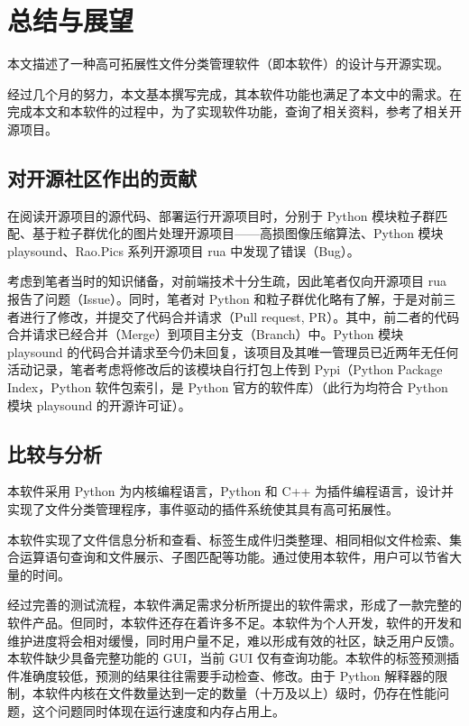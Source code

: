 \chapter{总结与展望}

本文描述了一种高可拓展性文件分类管理软件（即本软件）的设计与开源实现。

经过几个月的努力，本文基本撰写完成，其本软件功能也满足了本文中的需求。在完成本文和本软件的过程中，为了实现软件功能，查询了相关资料，参考了相关开源项目。

\section{对开源社区作出的贡献}

在阅读开源项目的源代码、部署运行开源项目时，分别于 Python 模块粒子群匹配、基于粒子群优化的图片处理开源项目——高损图像压缩算法、Python 模块 playsound、Rao.Pics 系列开源项目 rua 中发现了错误（Bug）。

考虑到笔者当时的知识储备，对前端技术十分生疏，因此笔者仅向开源项目 rua 报告了问题（Issue）。同时，笔者对 Python 和粒子群优化略有了解，于是对前三者进行了修改，并提交了代码合并请求（Pull request, PR）。其中，前二者的代码合并请求已经合并（Merge）到项目主分支（Branch）中。Python 模块 playsound 的代码合并请求至今仍未回复，该项目及其唯一管理员已近两年无任何活动记录，笔者考虑将修改后的该模块自行打包上传到 Pypi（Python Package Index，Python 软件包索引，是 Python 官方的软件库）（此行为均符合 Python 模块 playsound 的开源许可证）。

\section{比较与分析}

本软件采用 Python 为内核编程语言，Python 和 C++ 为插件编程语言，设计并实现了文件分类管理程序，事件驱动的插件系统使其具有高可拓展性。

本软件实现了文件信息分析和查看、标签生成件归类整理、相同相似文件检索、集合运算语句查询和文件展示、子图匹配等功能。通过使用本软件，用户可以节省大量的时间。

经过完善的测试流程，本软件满足需求分析所提出的软件需求，形成了一款完整的软件产品。但同时，本软件还存在着许多不足。本软件为个人开发，软件的开发和维护进度将会相对缓慢，同时用户量不足，难以形成有效的社区，缺乏用户反馈。本软件缺少具备完整功能的 GUI，当前 GUI 仅有查询功能。本软件的标签预测插件准确度较低，预测的结果往往需要手动检查、修改。由于 Python 解释器的限制，本软件内核在文件数量达到一定的数量（十万及以上）级时，仍存在性能问题，这个问题同时体现在运行速度和内存占用上。

